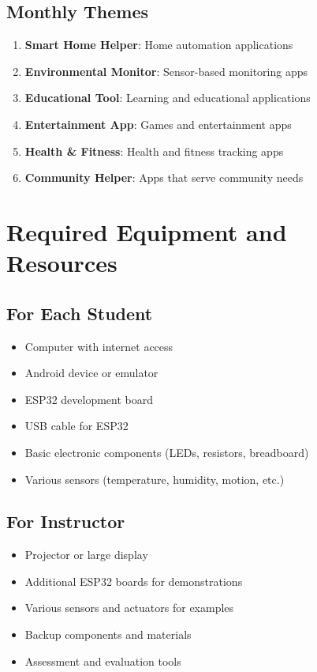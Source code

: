\documentclass[12pt,a4paper]{article}
\begin{document}
\subsection{Monthly Themes}
\begin{enumerate}
    \item \textbf{Smart Home Helper}: Home automation applications
    \item \textbf{Environmental Monitor}: Sensor-based monitoring apps
    \item \textbf{Educational Tool}: Learning and educational applications
    \item \textbf{Entertainment App}: Games and entertainment apps
    \item \textbf{Health \& Fitness}: Health and fitness tracking apps
    \item \textbf{Community Helper}: Apps that serve community needs
\end{enumerate}

\section{Required Equipment and Resources}

\subsection{For Each Student}
\begin{itemize}
    \item Computer with internet access
    \item Android device or emulator
    \item ESP32 development board
    \item USB cable for ESP32
    \item Basic electronic components (LEDs, resistors, breadboard)
    \item Various sensors (temperature, humidity, motion, etc.)
\end{itemize}

\subsection{For Instructor}
\begin{itemize}
    \item Projector or large display
    \item Additional ESP32 boards for demonstrations
    \item Various sensors and actuators for examples
    \item Backup components and materials
    \item Assessment and evaluation tools
\end{itemize}
\end{document}
